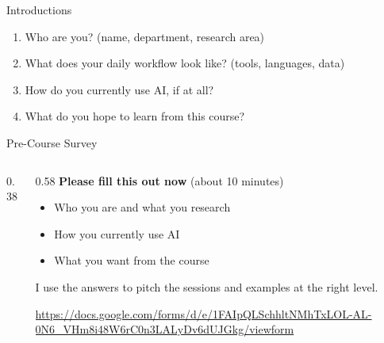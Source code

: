 \documentclass[aspectratio=169, 11pt]{beamer}
\begin{document}
\begin{frame}{Introductions}
  \begin{enumerate}
    \item Who are you? {\small (name, department, research area)}
    \item What does your daily workflow look like? {\small (tools, languages, data)}
    \item How do you currently use AI, if at all?
    \item What do you hope to learn from this course?
  \end{enumerate}
\end{frame}

\begin{frame}{Pre-Course Survey}
  \begin{columns}[c]
    \begin{column}{0.38\textwidth}
      \centering
    \end{column}
    \begin{column}{0.58\textwidth}
      \textbf{Please fill this out now} {\small (about 10 minutes)}

      \vspace{0.6em}
      \begin{itemize}
        \item Who you are and what you research
        \item How you currently use AI
        \item What you want from the course
      \end{itemize}

      \vspace{0.6em}
      I use the answers to pitch the sessions and examples at the right level.

      \vspace{0.8em}
      {\tiny \url{https://docs.google.com/forms/d/e/1FAIpQLSchhltNMhTxLOL-AL-0N6_VHm8i48W6rC0n3LALyDv6dUJGkg/viewform}}
    \end{column}
  \end{columns}
\end{frame}
\end{document}
